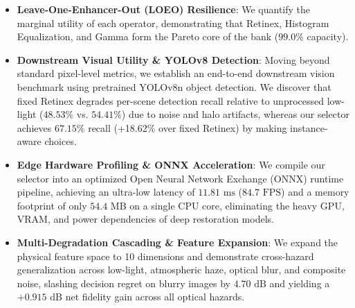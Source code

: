 \documentclass[journal]{IEEEtran}
\begin{document}
\begin{itemize}
    \item \textbf{Leave-One-Enhancer-Out (LOEO) Resilience}: We quantify the marginal utility of each operator, demonstrating that Retinex, Histogram Equalization, and Gamma form the Pareto core of the bank ($99.0\%$ capacity).
    \item \textbf{Downstream Visual Utility \& YOLOv8 Detection}: Moving beyond standard pixel-level metrics, we establish an end-to-end downstream vision benchmark using pretrained YOLOv8n object detection. We discover that fixed Retinex degrades per-scene detection recall relative to unprocessed low-light ($48.53\%$ vs. $54.41\%$) due to noise and halo artifacts, whereas our selector achieves $67.15\%$ recall (+18.62\% over fixed Retinex) by making instance-aware choices.
    \item \textbf{Edge Hardware Profiling \& ONNX Acceleration}: We compile our selector into an optimized Open Neural Network Exchange (ONNX) runtime pipeline, achieving an ultra-low latency of $11.81\text{ ms}$ ($84.7\text{ FPS}$) and a memory footprint of only $54.4\text{ MB}$ on a single CPU core, eliminating the heavy GPU, VRAM, and power dependencies of deep restoration models.
    \item \textbf{Multi-Degradation Cascading \& Feature Expansion}: We expand the physical feature space to 10 dimensions and demonstrate cross-hazard generalization across low-light, atmospheric haze, optical blur, and composite noise, slashing decision regret on blurry images by $4.70\text{ dB}$ and yielding a $+0.915\text{ dB}$ net fidelity gain across all optical hazards.
\end{itemize}
\end{document}
